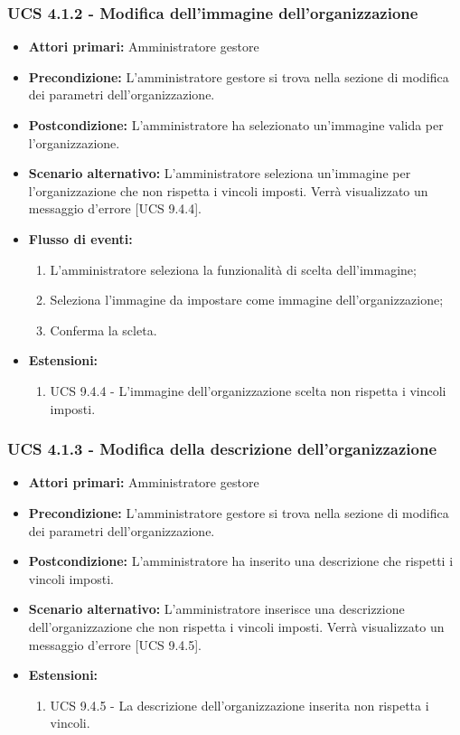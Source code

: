 \subsubsection{UCS 4.1.2 - Modifica dell'immagine dell'organizzazione}%
\begin{itemize}
\item \textbf{Attori primari:} Amministratore gestore
\item \textbf{Precondizione:} L'amministratore gestore si trova nella sezione di modifica dei parametri dell'organizzazione.
\item \textbf{Postcondizione:} L'amministratore ha selezionato un'immagine valida per l'organizzazione.
\item \textbf{Scenario alternativo:} L'amministratore seleziona un'immagine per l'organizzazione che non rispetta i vincoli imposti. Verrà visualizzato un messaggio d'errore [UCS 9.4.4].
\item \textbf{Flusso di eventi:}
\begin{enumerate}
    \item L'amministratore seleziona la funzionalità di scelta dell'immagine;
    \item Seleziona l'immagine da impostare come immagine dell'organizzazione;
    \item Conferma la scleta.
\end{enumerate}
\item \textbf{Estensioni:}
\begin{enumerate}
    \item UCS 9.4.4 - L'immagine dell'organizzazione scelta non rispetta i vincoli imposti.
\end{enumerate}
\end{itemize}

\subsubsection{UCS 4.1.3 - Modifica della descrizione dell'organizzazione}%
\begin{itemize}
\item \textbf{Attori primari:} Amministratore gestore
\item \textbf{Precondizione:} L'amministratore gestore si trova nella sezione di modifica dei parametri dell'organizzazione.
\item \textbf{Postcondizione:} L'amministratore ha inserito una descrizione che rispetti i vincoli imposti.
\item \textbf{Scenario alternativo:} L'amministratore inserisce una descrizzione dell'organizzazione che non rispetta i vincoli imposti. Verrà visualizzato un messaggio d'errore [UCS 9.4.5].
\item \textbf{Estensioni:}
\begin{enumerate}
    \item UCS 9.4.5 - La descrizione dell'organizzazione inserita non rispetta i vincoli.
\end{enumerate}
\end{itemize}

